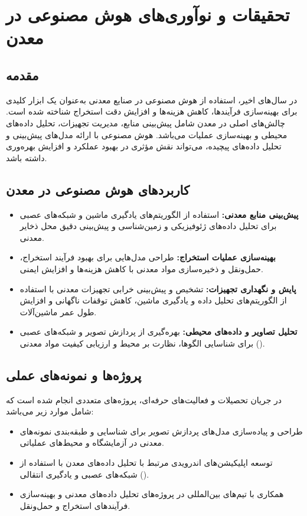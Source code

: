 \chapter{تحقیقات و نوآوری‌های هوش مصنوعی در معدن}

\section*{مقدمه}
در سال‌های اخیر، استفاده از هوش مصنوعی در صنایع معدنی به‌عنوان یک ابزار کلیدی برای بهینه‌سازی فرآیندها، کاهش هزینه‌ها و افزایش دقت استخراج شناخته شده است. چالش‌های اصلی در معدن شامل پیش‌بینی منابع، مدیریت تجهیزات، تحلیل داده‌های محیطی و بهینه‌سازی عملیات می‌باشد. هوش مصنوعی با ارائه مدل‌های پیش‌بینی و تحلیل داده‌های پیچیده، می‌تواند نقش مؤثری در بهبود عملکرد و افزایش بهره‌وری داشته باشد.

\section*{کاربردهای هوش مصنوعی در معدن}
\begin{itemize}
  \item \textbf{پیش‌بینی منابع معدنی:} استفاده از الگوریتم‌های یادگیری ماشین و شبکه‌های عصبی برای تحلیل داده‌های ژئوفیزیکی و زمین‌شناسی و پیش‌بینی دقیق محل ذخایر معدنی.
  \item \textbf{بهینه‌سازی عملیات استخراج:} طراحی مدل‌هایی برای بهبود فرآیند استخراج، حمل‌ونقل و ذخیره‌سازی مواد معدنی با کاهش هزینه‌ها و افزایش ایمنی.
  \item \textbf{پایش و نگهداری تجهیزات:} تشخیص و پیش‌بینی خرابی تجهیزات معدنی با استفاده از الگوریتم‌های تحلیل داده و یادگیری ماشین، کاهش توقفات ناگهانی و افزایش طول عمر ماشین‌آلات.
  \item \textbf{تحلیل تصاویر و داده‌های محیطی:} بهره‌گیری از پردازش تصویر و شبکه‌های عصبی () برای شناسایی الگوها، نظارت بر محیط و ارزیابی کیفیت مواد معدنی.
\end{itemize}

\section*{پروژه‌ها و نمونه‌های عملی}
در جریان تحصیلات و فعالیت‌های حرفه‌ای، پروژه‌های متعددی انجام شده است که شامل موارد زیر می‌باشد:
\begin{itemize}
  \item طراحی و پیاده‌سازی مدل‌های پردازش تصویر برای شناسایی و طبقه‌بندی نمونه‌های معدنی در آزمایشگاه و محیط‌های عملیاتی.
  \item توسعه اپلیکیشن‌های اندرویدی مرتبط با تحلیل داده‌های معدن با استفاده از شبکه‌های عصبی و یادگیری انتقالی ().
  \item همکاری با تیم‌های بین‌المللی در پروژه‌های تحلیل داده‌های معدنی و بهینه‌سازی فرآیندهای استخراج و حمل‌ونقل.
\end{itemize}

